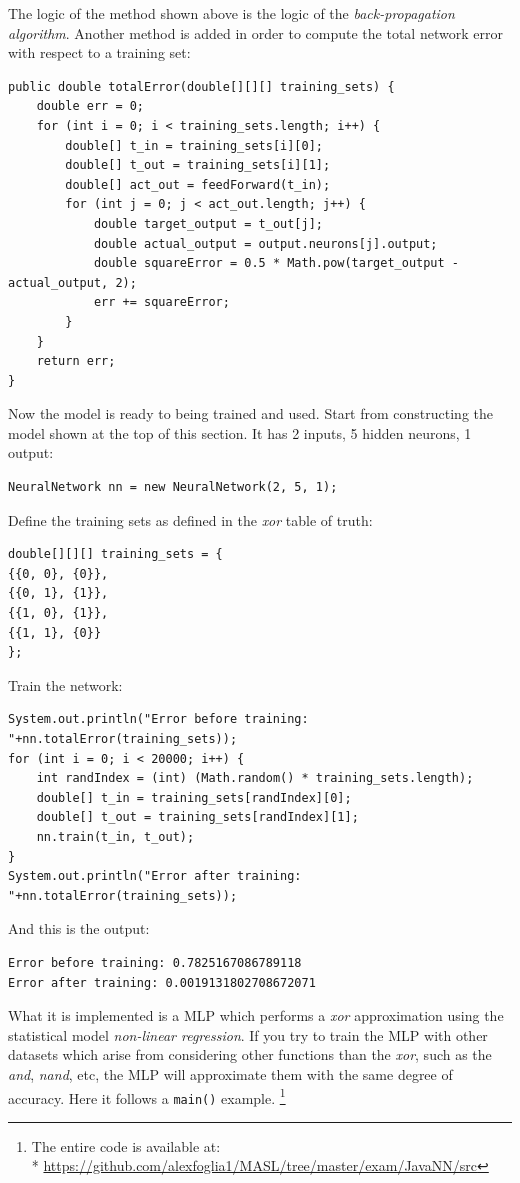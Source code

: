 \documentclass[10pt,a4paper]{article}
\begin{document}
The logic of the method shown above is the logic of the \emph{back-propagation algorithm}. Another method is added in order to compute the total network error with respect to a training set:
\begin{lstlisting}
public double totalError(double[][][] training_sets) {
	double err = 0;
	for (int i = 0; i < training_sets.length; i++) {
		double[] t_in = training_sets[i][0];
		double[] t_out = training_sets[i][1];
		double[] act_out = feedForward(t_in);
		for (int j = 0; j < act_out.length; j++) {
			double target_output = t_out[j];
			double actual_output = output.neurons[j].output;
			double squareError = 0.5 * Math.pow(target_output - actual_output, 2);
			err += squareError;
		}
	}
	return err;
}
\end{lstlisting}
Now the model is ready to being trained and used. Start from constructing the model shown at the top of this section. It has 2 inputs, 5 hidden neurons, 1 output:
\begin{lstlisting}
NeuralNetwork nn = new NeuralNetwork(2, 5, 1);
\end{lstlisting}
Define the training sets as defined in the \emph{xor} table of truth:
\begin{lstlisting}
double[][][] training_sets = {
{{0, 0}, {0}},
{{0, 1}, {1}},
{{1, 0}, {1}},
{{1, 1}, {0}}
};
\end{lstlisting}
Train the network:
\begin{lstlisting}
System.out.println("Error before training: "+nn.totalError(training_sets));
for (int i = 0; i < 20000; i++) {
	int randIndex = (int) (Math.random() * training_sets.length);
	double[] t_in = training_sets[randIndex][0];
	double[] t_out = training_sets[randIndex][1];
	nn.train(t_in, t_out);
}
System.out.println("Error after training: "+nn.totalError(training_sets));
\end{lstlisting}
And this is the output:
\begin{lstlisting}
Error before training: 0.7825167086789118
Error after training: 0.0019131802708672071
\end{lstlisting}
What it is implemented is a MLP which performs a \emph{xor} approximation using the statistical model \emph{non-linear regression}. If you try to train the MLP with other datasets which arise from considering other functions than the \emph{xor}, such as the \emph{and}, \emph{nand}, etc, the MLP will approximate them with the same degree of accuracy. Here it follows a \texttt{main()} example.
\footnote{The entire code is available at:\\* \href{https://github.com/alexfoglia1/MASL/tree/master/exam/JavaNN/src}{https://github.com/alexfoglia1/MASL/tree/master/exam/JavaNN/src}}
\end{document}
